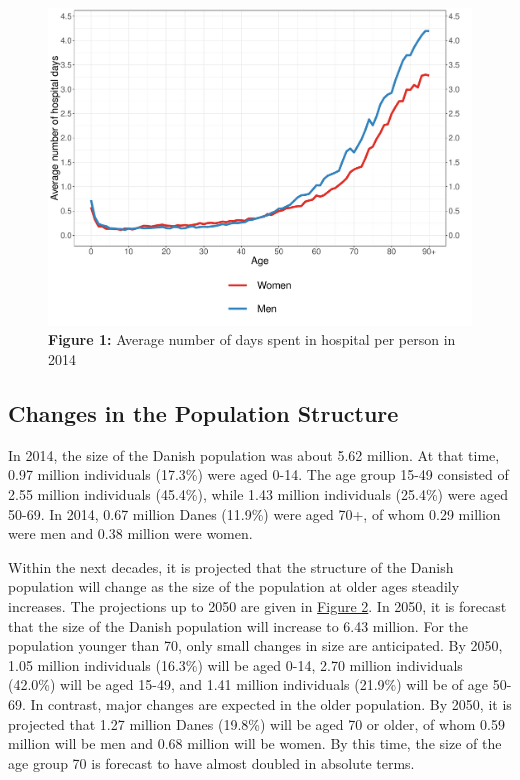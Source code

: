 	\begin{figure}[H]
		\centering
		\includegraphics[scale=0.435]{Paper_4/MAIN_Figure_1.pdf}
		\caption*{\textbf{Figure 1:} Average number of days spent in hospital per person in 2014}
	\label{ch5:fig1}
	\end{figure}

\subsection{Changes in the Population Structure}

In 2014, the size of the Danish population was about 5.62 million. At that time, 
0.97 million individuals (17.3\%) were aged 0-14. The age group 15-49 consisted 
of 2.55 million individuals (45.4\%), while 1.43 million individuals (25.4\%) 
were aged 50-69. In 2014, 0.67 million Danes (11.9\%) were aged 70+, of whom 
0.29 million were men and 0.38 million were women.

Within the next decades, it is projected that the structure of the Danish population 
will change as the size of the population at older ages steadily increases. The 
projections up to 2050 are given in \hyperref[ch5:fig2]{Figure 2}. In 2050, it is forecast that the 
size of the Danish population will increase to 6.43 million. For the population 
younger than 70, only small changes in size are anticipated. By 2050, 1.05 million 
individuals (16.3\%) will be aged 0-14, 2.70 million individuals (42.0\%) will be 
aged 15-49, and 1.41 million individuals (21.9\%) will be of age 50-69. In contrast, 
major changes are expected in the older population. By 2050, it is projected that 
1.27 million Danes (19.8\%) will be aged 70 or older, of whom 0.59 million will 
be men and 0.68 million will be women. By this time, the size of the age group 70 
is forecast to have almost doubled in absolute terms.\\


